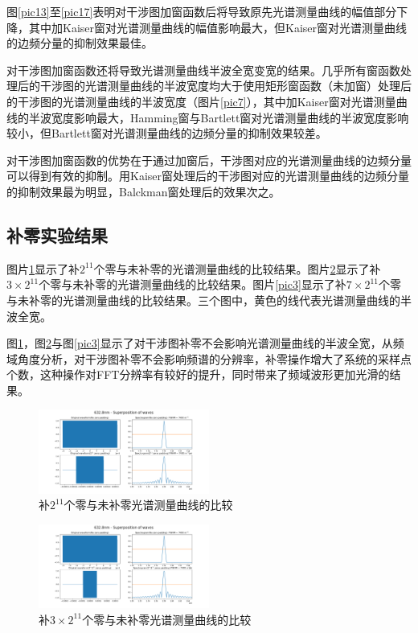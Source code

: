 \documentclass[conference]{IEEEtran}
\begin{document}
图\ref{pic13}至\ref{pic17}表明对干涉图加窗函数后将导致原先光谱测量曲线的幅值部分下降，其中加Kaiser窗对光谱测量曲线的幅值影响最大，但Kaiser窗对光谱测量曲线的边频分量的抑制效果最佳。

对干涉图加窗函数还将导致光谱测量曲线半波全宽变宽的结果。几乎所有窗函数处理后的干涉图的光谱测量曲线的半波宽度均大于使用矩形窗函数（未加窗）处理后的干涉图的光谱测量曲线的半波宽度（图片\ref{pic7}），其中加Kaiser窗对光谱测量曲线的半波宽度影响最大，Hamming窗与Bartlett窗对光谱测量曲线的半波宽度影响较小，但Bartlett窗对光谱测量曲线的边频分量的抑制效果较差。

对干涉图加窗函数的优势在于通过加窗后，干涉图对应的光谱测量曲线的边频分量可以得到有效的抑制。用Kaiser窗处理后的干涉图对应的光谱测量曲线的边频分量的抑制效果最为明显，Balckman窗处理后的效果次之。

\subsection{补零实验结果}
图片\ref{pic1}显示了补$2^{11}$个零与未补零的光谱测量曲线的比较结果。图片\ref{pic2}显示了补$3\times2^{11}$个零与未补零的光谱测量曲线的比较结果。图片\ref{pic3}显示了补$7\times2^{11}$个零与未补零的光谱测量曲线的比较结果。三个图中，黄色的线代表光谱测量曲线的半波全宽。

图\ref{pic1}，图\ref{pic2}与图\ref{pic3}显示了对干涉图补零不会影响光谱测量曲线的半波全宽，从频域角度分析，对干涉图补零不会影响频谱的分辨率，补零操作增大了系统的采样点个数，这种操作对FFT分辨率有较好的提升，同时带来了频域波形更加光滑的结果。
\begin{figure}[htbp]
    \centerline{\includegraphics[width=0.5\textwidth]{pic1.png}}
    \caption{补$2^{11}$个零与未补零光谱测量曲线的比较}
    \label{pic1}
\end{figure}

\begin{figure}[htbp]
    \centerline{\includegraphics[width=0.5\textwidth]{pic2.png}}
    \caption{补$3\times2^{11}$个零与未补零光谱测量曲线的比较}
    \label{pic2}
\end{figure}
\end{document}
